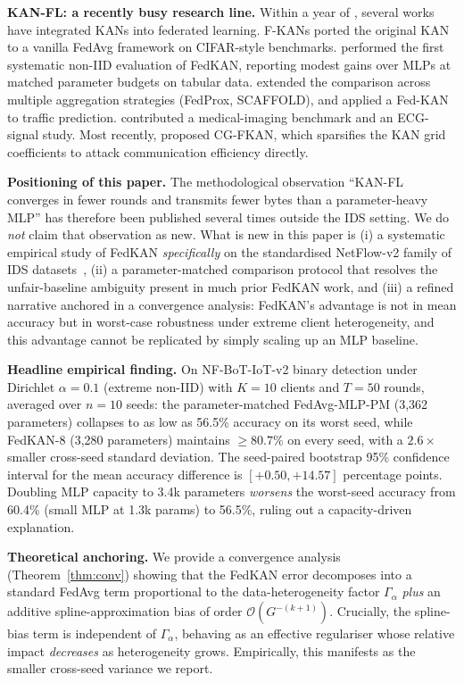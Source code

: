 \textbf{KAN-FL: a recently busy research line.} Within a year of \cite{liu2024kan}, several works have integrated KANs into federated learning. F-KANs \cite{zeydan2024fkans} ported the original KAN to a vanilla FedAvg framework on CIFAR-style benchmarks. \cite{sasse2024evaluating} performed the first systematic non-IID evaluation of FedKAN, reporting modest gains over MLPs at matched parameter budgets on tabular data. \cite{ma2025enhancing} extended the comparison across multiple aggregation strategies (FedProx, SCAFFOLD), and \cite{zeydan2025fedkan} applied a Fed-KAN to traffic prediction. \cite{lee2025unified} contributed a medical-imaging benchmark and \cite{zeleke2024federated} an ECG-signal study. Most recently, \cite{yu2025cgfkan} proposed CG-FKAN, which sparsifies the KAN grid coefficients to attack communication efficiency directly.

\textbf{Positioning of this paper.} The methodological observation ``KAN-FL converges in fewer rounds and transmits fewer bytes than a parameter-heavy MLP'' has therefore been published several times outside the IDS setting. We do \emph{not} claim that observation as new. What is new in this paper is (i) a systematic empirical study of FedKAN \emph{specifically} on the standardised NetFlow-v2 family of IDS datasets~\cite{sarhan2022standard}, (ii) a parameter-matched comparison protocol that resolves the unfair-baseline ambiguity present in much prior FedKAN work, and (iii) a refined narrative anchored in a convergence analysis: FedKAN's advantage is not in mean accuracy but in worst-case robustness under extreme client heterogeneity, and this advantage cannot be replicated by simply scaling up an MLP baseline.

\textbf{Headline empirical finding.} On NF-BoT-IoT-v2 binary detection under Dirichlet $\alpha = 0.1$ (extreme non-IID) with $K=10$ clients and $T=50$ rounds, averaged over $n=10$ seeds: the parameter-matched FedAvg-MLP-PM (3,362 parameters) collapses to as low as 56.5\% accuracy on its worst seed, while FedKAN-8 (3,280 parameters) maintains $\geq 80.7\%$ on every seed, with a $2.6\times$ smaller cross-seed standard deviation. The seed-paired bootstrap 95\% confidence interval for the mean accuracy difference is $[+0.50, +14.57]$ percentage points. Doubling MLP capacity to 3.4k parameters \emph{worsens} the worst-seed accuracy from 60.4\% (small MLP at 1.3k params) to 56.5\%, ruling out a capacity-driven explanation.

\textbf{Theoretical anchoring.} We provide a convergence analysis (Theorem~\ref{thm:conv}) showing that the FedKAN error decomposes into a standard FedAvg term proportional to the data-heterogeneity factor $\Gamma_\alpha$ \emph{plus} an additive spline-approximation bias of order $\mathcal{O}(G^{-(k+1)})$. Crucially, the spline-bias term is independent of $\Gamma_\alpha$, behaving as an effective regulariser whose relative impact \emph{decreases} as heterogeneity grows. Empirically, this manifests as the smaller cross-seed variance we report.

